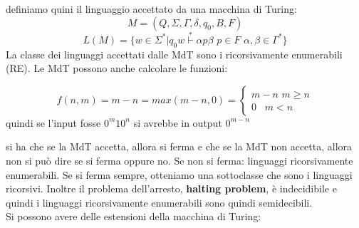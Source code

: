 	definiamo quini il linguaggio accettato da una macchina di Turing:
	$$M=(Q,\Sigma,\Gamma,\delta,q_0,B,F)$$
	$$L(M)=\{w\in\Sigma^*|q_0w\stackrel{*}{\vdash}\alpha p\beta\,\,p\in F\,\,\alpha,\beta\in\Gamma^*\}$$
	La classe dei linguaggi accettati dalle MdT sono i ricorsivamente enumerabili (RE).
	Le MdT possono anche calcolare le funzioni:
	\begin{example}
		$$f(n,m)=m-n=max(m-n,0)=\begin{cases}
				m-n\,\,m\geq n \\
				0\,\,\,\,\,m<n
			\end{cases}$$
		quindi se l'input fosse $0^m10^n$ si avrebbe in output $0^{m-n}$
	\end{example}
	si ha che se la MdT accetta, allora si ferma e che se la MdT non accetta, allora non si può dire se si ferma oppure no. Se non si ferma: linguaggi ricorsivamente enumerabili. Se si ferma sempre, otteniamo una sottoclasse che sono i linguaggi ricorsivi. Inoltre il problema dell'arresto, \textbf{halting problem}, è indecidibile e quindi i linguaggi ricorsivamente enumerabili sono quindi semidecibili.\\
	Si possono avere delle estensioni della macchina di Turing:
